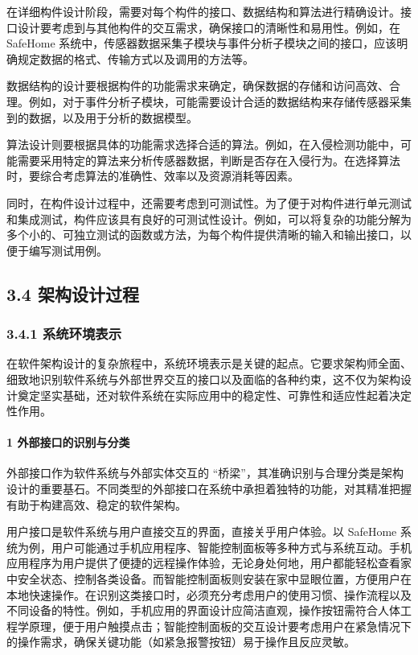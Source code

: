 在详细构件设计阶段，需要对每个构件的接口、数据结构和算法进行精确设计。接口设计要考虑到与其他构件的交互需求，确保接口的清晰性和易用性。例如，在 SafeHome 系统中，传感器数据采集子模块与事件分析子模块之间的接口，应该明确规定数据的格式、传输方式以及调用的方法等。

数据结构的设计要根据构件的功能需求来确定，确保数据的存储和访问高效、合理。例如，对于事件分析子模块，可能需要设计合适的数据结构来存储传感器采集到的数据，以及用于分析的数据模型。

算法设计则要根据具体的功能需求选择合适的算法。例如，在入侵检测功能中，可能需要采用特定的算法来分析传感器数据，判断是否存在入侵行为。在选择算法时，要综合考虑算法的准确性、效率以及资源消耗等因素。

同时，在构件设计过程中，还需要考虑到可测试性。为了便于对构件进行单元测试和集成测试，构件应该具有良好的可测试性设计。例如，可以将复杂的功能分解为多个小的、可独立测试的函数或方法，为每个构件提供清晰的输入和输出接口，以便于编写测试用例。

\hypertarget{ux67b6ux6784ux8bbeux8ba1ux8fc7ux7a0b}{%
\subsection{3.4 架构设计过程}\label{ux67b6ux6784ux8bbeux8ba1ux8fc7ux7a0b}}

\hypertarget{ux7cfbux7edfux73afux5883ux8868ux793a}{%
\subsubsection{3.4.1 系统环境表示}\label{ux7cfbux7edfux73afux5883ux8868ux793a}}

在软件架构设计的复杂旅程中，系统环境表示是关键的起点。它要求架构师全面、细致地识别软件系统与外部世界交互的接口以及面临的各种约束，这不仅为架构设计奠定坚实基础，还对软件系统在实际应用中的稳定性、可靠性和适应性起着决定性作用。

\hypertarget{ux5916ux90e8ux63a5ux53e3ux7684ux8bc6ux522bux4e0eux5206ux7c7b}{%
\paragraph{1 外部接口的识别与分类}\label{ux5916ux90e8ux63a5ux53e3ux7684ux8bc6ux522bux4e0eux5206ux7c7b}}

外部接口作为软件系统与外部实体交互的 ``桥梁''，其准确识别与合理分类是架构设计的重要基石。不同类型的外部接口在系统中承担着独特的功能，对其精准把握有助于构建高效、稳定的软件架构。

用户接口是软件系统与用户直接交互的界面，直接关乎用户体验。以 SafeHome 系统为例，用户可能通过手机应用程序、智能控制面板等多种方式与系统互动。手机应用程序为用户提供了便捷的远程操作体验，无论身处何地，用户都能轻松查看家中安全状态、控制各类设备。而智能控制面板则安装在家中显眼位置，方便用户在本地快速操作。在识别这类接口时，必须充分考虑用户的使用习惯、操作流程以及不同设备的特性。例如，手机应用的界面设计应简洁直观，操作按钮需符合人体工程学原理，便于用户触摸点击；智能控制面板的交互设计要考虑用户在紧急情况下的操作需求，确保关键功能（如紧急报警按钮）易于操作且反应灵敏。


